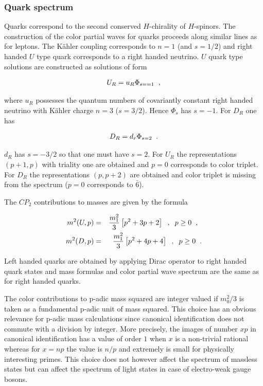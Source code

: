 \documentclass[10pt,epsf]{article}
\begin{document}
\subsubsection{Quark spectrum}

Quarks correspond to the second conserved  $H$-chirality of $H$-spinors. The construction of the color partial waves for quarks proceeds along similar lines as for leptons. The K\"ahler coupling corresponds to $n=1$ (and $s=1/2$) and right handed $U$ type quark corresponds to a right handed neutrino. $U$ quark type solutions are constructed as solutions of form

\begin{eqnarray}
U_R=  u_R\Phi_{s==1}\hspace{.2cm} ,
\end{eqnarray}



\noindent where  $u_R$ possesses the quantum numbers of covariantly constant right handed neutrino with K\"ahler charge $n=3$ ($s=3/2$). Hence   $\Phi_s$ has  $s=-1$.  For $D_R$ one has

\begin{eqnarray}
D_R= d_r\Phi_{s=2}\hspace{.2cm} .
\end{eqnarray}



\noindent $d_R$ has $s=-3/2$ so that one must have $s= 2$. For $U_R$ the representations $(p+1,p)$ with triality one are obtained and $p=0$ corresponds to color triplet. For $D_R$ the representations $(p,p+2)$ are obtained and color triplet is missing from the spectrum ($p=0$ corresponds to $\bar{6}$).


The $CP_2$ contributions to  masses are given by the formula

\begin{eqnarray} 
m^2(U,p)&=& \frac{m_1^2}{3}\left[p^2+3p+2   \right] \hspace{.2cm} ,\hspace{.2cm}  p\geq 0\hspace{.2cm} , \hspace{.2cm} \nonumber\\ m^2(D,p)&=& \frac{m_1^2}{3}\left[p^2+ 4 p +4\right] \hspace{.2cm} ,\hspace{.2cm}  p\geq 0\hspace{.2cm} . \end{eqnarray}


\noindent Left handed quarks are obtained by applying Dirac operator to right handed quark states and mass formulas and color partial wave spectrum are the same as for right handed quarks.

The color contributions to p-adic mass squared are integer valued if $m_0^2/3$ is taken as a fundamental p-adic unit of mass squared. This choice has an obvious relevance for p-adic mass calculations since  canonical identification does not commute with a division by integer.  More precisely, the images of number $xp$ in canonical identification has a value of order $1$ when $x$ is a non-trivial rational whereas for $x= np$ the value is $n/p$ and extremely is small for physically interesting primes. This choice does not however affect the spectrum of massless states but can affect the spectrum of light states in case of electro-weak gauge bosons.
\end{document}
